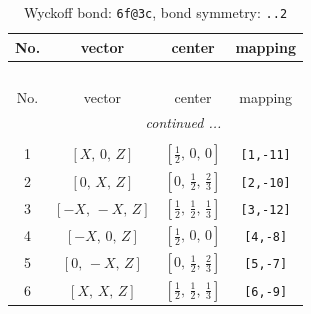 \documentclass[fleqn,8pt]{jsarticle}
\begin{document}
\begin{longtable}{cccc}
\caption{Wyckoff bond: {\tt 6f@3c}, bond symmetry: {\tt ..2}}
 \\
 \hline \hline
No. & vector & center & mapping \\ \hline \endfirsthead

\multicolumn{3}{l}{\tablename\ \thetable{}} \\
 \hline \hline
No. & vector & center & mapping \\ \hline \endhead

 \hline \hline
\multicolumn{3}{r}{\footnotesize\it continued ...} \\ \endfoot

 \hline \hline
\multicolumn{3}{r}{} \\ \endlastfoot

1 & $\left[ X,\, 0,\, Z \right]$ & $\left[ \frac{1}{2},\, 0,\, 0 \right]$ & {\tt [1,-11]} \\ \hline
2 & $\left[ 0,\, X,\, Z \right]$ & $\left[ 0,\, \frac{1}{2},\, \frac{2}{3} \right]$ & {\tt [2,-10]} \\ \hline
3 & $\left[ - X,\, - X,\, Z \right]$ & $\left[ \frac{1}{2},\, \frac{1}{2},\, \frac{1}{3} \right]$ & {\tt [3,-12]} \\ \hline
4 & $\left[ - X,\, 0,\, Z \right]$ & $\left[ \frac{1}{2},\, 0,\, 0 \right]$ & {\tt [4,-8]} \\ \hline
5 & $\left[ 0,\, - X,\, Z \right]$ & $\left[ 0,\, \frac{1}{2},\, \frac{2}{3} \right]$ & {\tt [5,-7]} \\ \hline
6 & $\left[ X,\, X,\, Z \right]$ & $\left[ \frac{1}{2},\, \frac{1}{2},\, \frac{1}{3} \right]$ & {\tt [6,-9]} \\
\end{longtable}
\renewcommand{\arraystretch}{1.2}
\end{document}
